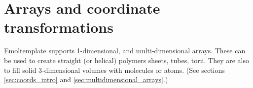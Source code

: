 \documentclass[11pt]{article}
\begin{document}







\section{Arrays and coordinate transformations}
\label{sec:arrays}
Emoltemplate supports 1-dimensional, and multi-dimensional arrays.
These can be used to create straight (or helical) polymers
sheets, tubes, torii.
They are also to fill solid 3-dimensional volumes
with molecules or atoms.
(See sections \ref{sec:coords_intro} and \ref{sec:multidimensional_arrays}.)
\end{document}
